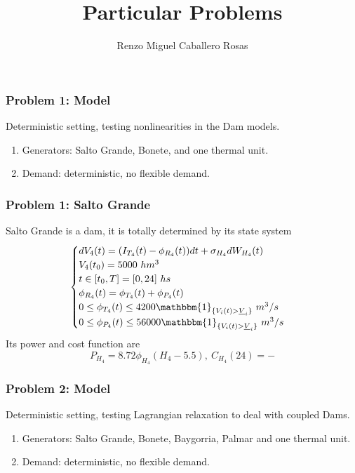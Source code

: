 \documentclass[aspectratio=169]{beamer}\usepackage[utf8]{inputenc}
\title{Particular Problems}
\subtitle{Renzo Miguel Caballero Rosas}
\begin{document}
\begin{frame}
\titlepage
\end{frame}

\begin{frame}\frametitle{Problem 1: Model}
Deterministic setting, testing nonlinearities in the Dam models.
\begin{enumerate}
\item Generators: Salto Grande, Bonete, and one thermal unit.
\item Demand: deterministic, no flexible demand.
\end{enumerate}
\end{frame}

\begin{frame}\frametitle{Problem 1: Salto Grande}
Salto Grande is a dam, it is totally determined by its state system
\begin{equation*}
\begin{cases}
dV_4(t)=(I_{T_4}(t)-\phi_{R_4}(t))dt+\sigma_{H_4}dW_{H_4}(t)\\
V_4(t_0)=5000\ hm^3\\
t\in[t_0,T]=[0,24]\ hs\\
\phi_{R_4}(t)=\phi_{T_4}(t)+\phi_{P_4}(t)\\
0\leq\phi_{T_4}(t)\leq4200\mathbbm{1}_{\{V_i(t)>\underline{V}_i\}}\ m^3/s\\
0\leq\phi_{P_4}(t)\leq56000\mathbbm{1}_{\{V_i(t)>\underline{V}_i\}}\ m^3/s\\
\end{cases}
\end{equation*}
Its power and cost function are
\begin{equation*}
P_{H_4}=8.72\phi_{H_4}(H_4-5.5),\ C_{H_4}(24)=-
\end{equation*}




\end{frame}

















\begin{frame}\frametitle{Problem 2: Model}
Deterministic setting, testing Lagrangian relaxation to deal with coupled Dams.
\begin{enumerate}
\item Generators: Salto Grande, Bonete, Baygorria, Palmar and one thermal unit.
\item Demand: deterministic, no flexible demand.
\end{enumerate}
\end{frame}
\end{document}
